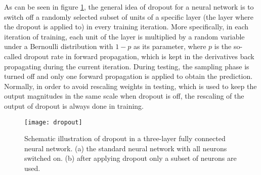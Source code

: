 As can be seen in figure \ref{fig:dropout}, the general idea of dropout for a neural network is to switch off a randomly selected subset of units of a specific layer (the layer where the dropout is applied to) in every training iteration.
More specifically, in each iteration of training, each unit of the layer is multiplied by a random variable under a Bernoulli distribution with $1-p$ as its parameter, where $p$ is the so-called dropout rate in forward propagation, which is kept in the derivatives back propagating during the current iteration.
During testing, the sampling phase is turned off and only one forward propagation is applied to obtain the prediction. 
Normally, in order to avoid rescaling weights in testing, which is used to keep the output magnitudes in the same scale when dropout is off, the rescaling of the output of dropout is always done in training. 
\begin{figure}[H]
	\begin{center}
		\texttt{[image: dropout]}
		\caption{Schematic illustration of dropout in a three-layer fully connected neural network. (a) the standard neural network with all neurons switched on. (b) after applying dropout only a subset of neurons are used\cite{srivastava2014dropout}.}		
		\label{fig:dropout}
	\end{center}
\end{figure}


